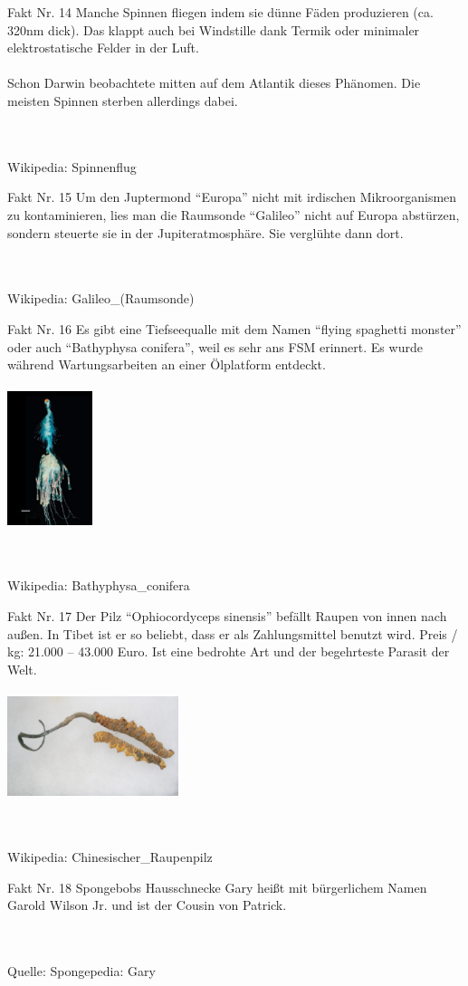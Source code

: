 \documentclass{beamer}
\newenvironment{fakt}[1]
{\begin{frame}{Fakt Nr. #1}\centering}
{\end{frame}}
\newcommand{\rating}[1]{}
\newcommand{\wiki}[1]{\\\hfill\\Wikipedia: #1}
\newcommand{\source}[1]{\\\hfill\\Quelle: #1}
\begin{document}
	\begin{fakt}{14}
		Manche Spinnen fliegen indem sie dünne Fäden produzieren (ca. 320nm dick). Das klappt auch bei Windstille dank Termik oder minimaler elektrostatische Felder in der Luft.\\
		\hfill\\
		Schon Darwin beobachtete mitten auf dem Atlantik dieses Phänomen. Die meisten Spinnen sterben allerdings dabei.
		\rating{9}
		\wiki{Spinnenflug}
	\end{fakt}
	
	\begin{fakt}{15}
		Um den Juptermond "`Europa"' nicht mit irdischen Mikroorganismen zu kontaminieren, lies man die Raumsonde "`Galileo"' nicht auf Europa abstürzen, sondern steuerte sie in der Jupiteratmosphäre. Sie verglühte dann dort.
		\rating{10}
		\wiki{Galileo\_(Raumsonde)}
	\end{fakt}
	
	\begin{fakt}{16}
		Es gibt eine Tiefseequalle mit dem Namen "`flying spaghetti monster"' oder auch "`Bathyphysa conifera"', weil es sehr ans FSM erinnert. Es wurde während Wartungsarbeiten an einer Ölplatform entdeckt.\\
		\hfill\\
		\includegraphics[width=2.5cm]{images/fsm}
		\rating{8}
		\wiki{Bathyphysa\_conifera}
	\end{fakt}
	
	\begin{fakt}{17}
		Der Pilz "`Ophiocordyceps sinensis"' befällt Raupen von innen nach außen.
		In Tibet ist er so beliebt, dass er als Zahlungsmittel benutzt wird.
		Preis / kg: 21.000 -- 43.000 Euro. Ist eine bedrohte Art und der begehrteste Parasit der Welt.\\
		\hfill\\
		\includegraphics[width=5cm]{images/CordycepsSinensis}
		\rating{8}
		\wiki{Chinesischer\_Raupenpilz}
	\end{fakt}
	
	\begin{fakt}{18}
		Spongebobs Hausschnecke Gary heißt mit bürgerlichem Namen Garold Wilson Jr. und ist der Cousin von Patrick.
		\rating{11}
		\source{Spongepedia: Gary}
	\end{fakt}
\end{document}
